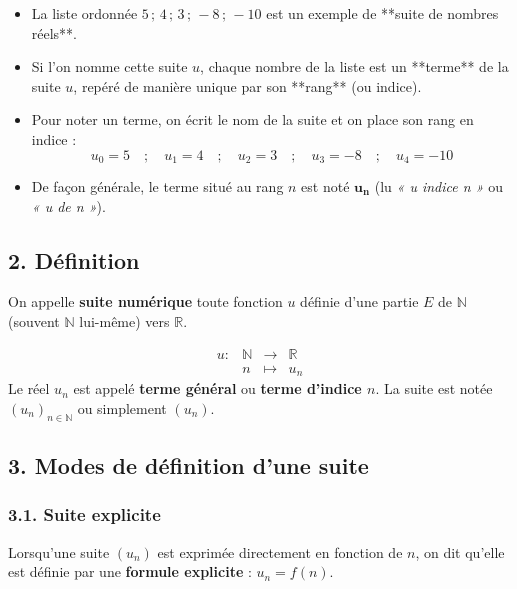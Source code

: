 \documentclass[12pt,a4paper]{article}
\begin{document}
\vspace{0.3cm}


\begin{tcolorbox}[colback=yellow!5!white,colframe=myred,title=\textbf{Exploitation pédagogique}]
\begin{itemize}[label=$\Rightarrow$]
    \item La liste ordonnée $5 \,;\, 4 \,;\, 3 \,;\, -8 \,;\, -10$ est un exemple de **suite de nombres réels**.
    \item Si l'on nomme cette suite $u$, chaque nombre de la liste est un **terme** de la suite $u$, repéré de manière unique par son **rang** (ou indice).
    \item Pour noter un terme, on écrit le nom de la suite et on place son rang en indice :
    \[
    u_0 = 5 \quad;\quad u_1 = 4 \quad;\quad u_2 = 3 \quad;\quad u_3 = -8 \quad;\quad u_4 = -10
    \]
    \item De façon générale, le terme situé au rang $n$ est noté $\mathbf{u_n}$ (lu \textit{« u indice n »} ou \textit{« u de n »}).
\end{itemize}
\end{tcolorbox}

\subsection*{\color{myred}2. Définition}

\begin{tcolorbox}[colback=red!5!white,colframe=myred,title=\textbf{Définition}]
On appelle \textbf{suite numérique} toute fonction $u$ définie d'une partie $E$ de $\mathbb{N}$ (souvent $\mathbb{N}$ lui-même) vers $\mathbb{R}$.

\[
\begin{array}{cccc}
u : & \mathbb{N} & \to & \mathbb{R} \\
    & n & \mapsto & u_n
\end{array}
\]
Le réel $u_n$ est appelé \textbf{terme général} ou \textbf{terme d'indice $n$}. La suite est notée $(u_n)_{n \in \mathbb{N}}$ ou simplement $(u_n)$.
\end{tcolorbox}

\subsection*{\color{myred}3. Modes de définition d'une suite}

\subsubsection*{\color{myblue}3.1. Suite explicite}
Lorsqu'une suite $(u_n)$ est exprimée directement en fonction de $n$, on dit qu'elle est définie par une \textbf{formule explicite} : $u_n = f(n)$.
\end{document}
